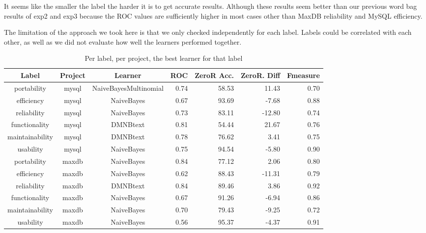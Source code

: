 \documentclass{acm_proc_article-sp}
\begin{document}
It seems like the smaller the label the harder it is to get accurate results. Although these results seem better than our previous word bag results of \textsf{exp2} and \textsf{exp3} because the ROC values are sufficiently higher in most cases other than MaxDB reliability and MySQL efficiency.

The limitation of the approach we took here is that we only checked independently for each label. Labels could be correlated with each other, as well as we did not evaluate how well the learners performed together.


\begin{table}
\centering
\begin{tabular}{ccc|rrrr}
Label & Project & Learner & ROC & ZeroR Acc. & ZeroR. Diff & Fmeasure\\
\hline
portability &  mysql &  NaiveBayesMultinomial &  0.74 &  58.53 &  11.43 &  0.70  \\ 
efficiency &  mysql &  NaiveBayes &  0.67 &  93.69 &  -7.68 &  0.88 \\ 
reliability &  mysql &  NaiveBayes &  0.73 &  83.11 &  -12.80 &  0.74 \\ 
functionality &  mysql &  DMNBtext &  0.81 &  54.44 &  21.67 &  0.76 \\ 
maintainability &  mysql &  DMNBtext &  0.78 &  76.62 &  3.41 &  0.75 \\ 
usability &  mysql &  NaiveBayes &  0.75 &  94.54 &  -5.80 &  0.90  \\ 
 \hline 
portability &  maxdb &  NaiveBayes &  0.84 &  77.12 &  2.06 &  0.80 \\ 
efficiency &  maxdb &  NaiveBayes &  0.62 &  88.43 &  -11.31 &  0.79 \\ 
reliability &  maxdb &  DMNBtext &  0.84 &  89.46 &  3.86 &  0.92  \\ 
functionality &  maxdb &  NaiveBayes &  0.67 &  91.26 &  -6.94 &  0.86  \\ 
maintainability &  maxdb &  NaiveBayes &  0.70 &  79.43 &  -9.25 &  0.72  \\ 
usability &  maxdb &  NaiveBayes &  0.56 &  95.37 &  -4.37 &  0.91  \\ 
 \hline 
\end{tabular}
\caption{Per label, per project, the best learner for that label}
\label{tab:best-learner-per-tag}
\end{table}
\end{document}
